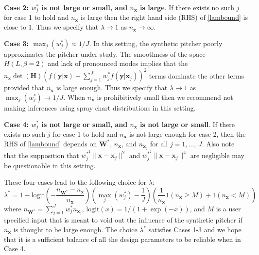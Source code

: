 \documentclass[11pt]{article}
\newcommand{\Hbf}{\textbf{H}}
\newcommand{\W}{\textbf{W}}
\newcommand{\y}{\textbf{y}}
\newcommand{\x}{\textbf{x}}
\newcommand{\Wstar}{\W^{\textstyle{*}}}
\newcommand{\wstar}{w^{\textstyle{*}}}
\newcommand{\wstarsq}{w^{\textstyle{*}^2}}
\newcommand{\lamstar}{\lambda^{\textstyle{*}}}
\begin{document}
\vspace{0.25cm}
\textbf{Case 2: $\wstar_j$ is not large or small, and $n_{\x}$ is large}. If there exists no such $j$ for case 1 to hold and $n_{\x}$ is large then the right hand side (RHS) of \eqref{lambound} is close to 1. Thus we specify that $\lambda \to 1$ as $n_{\x} \to \infty$. 

\vspace{0.25cm}
\textbf{Case 3: $\max_j(\wstar_j) \approx 1/J$}. In this setting, the synthetic pitcher poorly approximates the pitcher under study. The smoothness of the space $H(L,\beta=2)$ and lack of pronounced modes implies that the $n_\x\det(\Hbf)\left(f(\y|\x) - \sum_{j=1}^J\wstar_jf(\y|\x_j)\right)^2$ terms dominate the other terms provided that $n_{\x}$ is large enough. Thus we specify that $\lambda \to 1$ as $\max_j(\wstar_j) \to 1/J$. When $n_{\x}$ is prohibitively small then we recommend not making inferences using spray chart distributions in this setting.

\vspace{0.25cm}
\textbf{Case 4: $\wstar_j$ is not large or small, and $n_{\x}$ is not large or small}. If there exists no such $j$ for case 1 to hold and $n_{\x}$ is not large enough for case 2, then the RHS of \eqref{lambound} depends on $\Wstar$, $n_{\x}$, and $n_{\x_j}$ for all $j = 1,\ldots$, $J$. Also note that the supposition that $\wstarsq_j\|\x-\x_j\|^2$ and $\wstarsq_j\|\x-\x_j\|^4$ are negligible may be questionable in this setting.


\vspace{0.25cm}
These four cases lead to the following choice for $\lambda$:
$$
  \lamstar = 1 - \text{logit}\left(-\frac{n_{\Wstar} - n_\x}{n_\x}\right)
    \left(\max_j(\wstar_j) - \frac{1}{J}\right)
    \left(\frac{1}{n_\x}1(n_\x \geq M) + 1(n_\x < M) \right)
$$
where $n_{\Wstar} = \sum_{j=1}^J \wstar_j n_{\x_j}$, $\text{logit}(x) = 1/(1 + \exp(-x))$, and $M$ is a user specified input that is meant to void out the influence of the synthetic pitcher if $n_\x$ is thought to be large enough. The choice $\lamstar$ satisfies Cases 1-3 and we hope that it is a sufficient balance of all the design parameters to be reliable when in Case 4.









\end{document}
